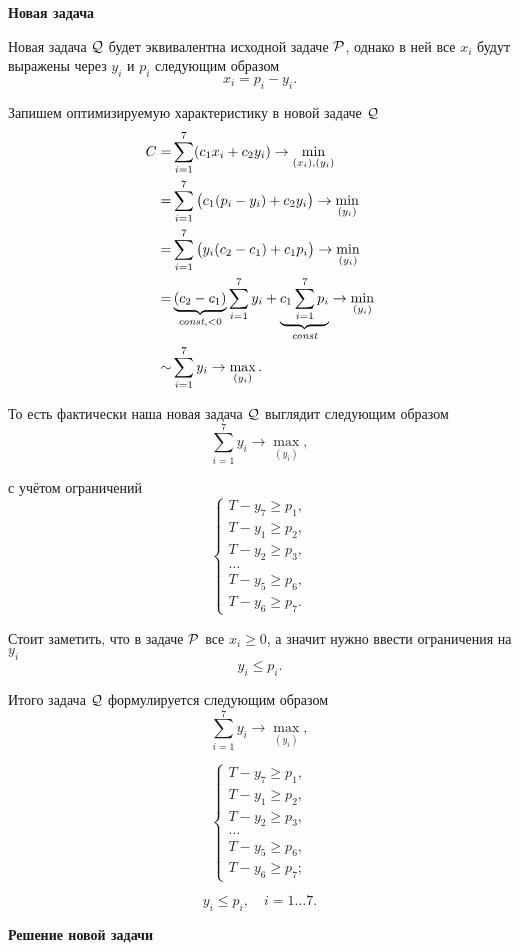 \bigskip

\textbf{Новая задача}

Новая задача $\Q$ будет эквивалентна исходной задаче $\P$, однако в ней все $x_i$ будут выражены через $y_i$ и $p_i$ следующим образом
\[
x_i = p_i - y_i.
\]

Запишем оптимизируемую характеристику в новой задаче $\Q$
\begin{align*}
	C =& \sum_{i=1}^7 (c_1 x_i + c_2 y_i) \to \min_{(x_i), (y_i)} \\
	=& \sum_{i=1}^7 \big(c_1 (p_i - y_i) + c_2 y_i\big) \to \min_{(y_i)} \\
	=&  \sum_{i=1}^7 \big(y_i (c_2 - c_1) + c_1 p_i\big) \to \min_{(y_i)} \\
	=& \underbrace{(c_2 - c_1)}_{\const, <0} \sum_{i=1}^7 y_i + \underbrace{c_1 \sum_{i=1}^{7} p_i}_{\const} \to \min_{(y_i)} \\
	\sim& \sum_{i=1}^7 y_i \to \max_{(y_i)}.
\end{align*}

То есть фактически наша новая задача $\Q$ выглядит следующим образом
\[
\sum_{i=1}^7 y_i \to \max_{(y_i)},
\]

с учётом ограничений
\[
\begin{cases}
	T - y_7 \ge p_1, \\
	T - y_1 \ge p_2, \\
	T - y_2 \ge p_3, \\
	\dots \\
	T - y_5 \ge p_6, \\
	T - y_6 \ge p_7.
\end{cases}
\]

Стоит заметить, что в задаче $\P$ все $x_i \ge 0$, а значит нужно ввести ограничения на $y_i$
\[
	y_i \le p_i.
\]

Итого задача $\Q$ формулируется следующим образом
\[
\sum_{i=1}^7 y_i \to \max_{(y_i)},
\]

\[
\begin{cases}
	T - y_7 \ge p_1, \\
	T - y_1 \ge p_2, \\
	T - y_2 \ge p_3, \\
	\dots \\
	T - y_5 \ge p_6, \\
	T - y_6 \ge p_7;
\end{cases}
\]

\[
y_i \le p_i, \quad i = 1 \dots 7.
\]

\textbf{Решение новой задачи}

